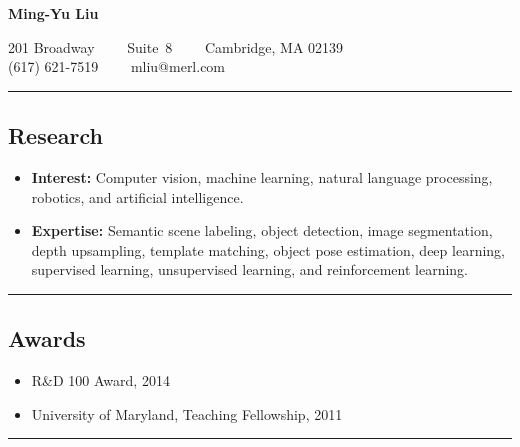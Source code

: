 \documentclass[10pt,letterpaper]{article}
\begin{document}
\begin{center}
{\LARGE \textbf{Ming-Yu Liu}}

201 Broadway\ \ \textbullet
\ \ Suite\ 8\ \ \textbullet
\ \ Cambridge, MA 02139
\\
(617) 621-7519\ \ \textbullet
\ \ mliu@merl.com
\end{center}

\hrule
\vspace{-0.4em}
\subsection*{Research}
\begin{itemize}
\item {\bf Interest:} Computer vision, machine learning, natural language processing, robotics, and artificial intelligence.\vspace{-2mm}
\item {\bf Expertise:} Semantic scene labeling, object detection, image segmentation, depth upsampling, template matching, object pose estimation, deep learning, supervised learning, unsupervised learning, and reinforcement learning.
\end{itemize}

\hrule
\vspace{-0.4em}
\subsection*{Awards}
\begin{itemize}
\item R\&D 100 Award, 2014\vspace{-2mm}
\item University of Maryland, Teaching Fellowship, 2011
\end{itemize}

\hrule
\vspace{-0.4em}
\end{document}
